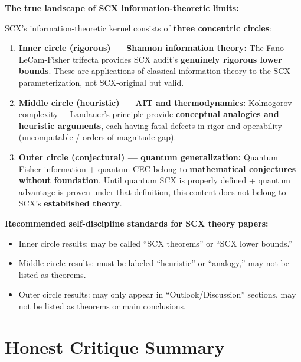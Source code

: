 \documentclass[12pt,a4paper]{article}
\theoremstyle{plain}
\theoremstyle{definition}
\begin{document}
\begin{limitbox}
\textbf{The true landscape of SCX information-theoretic limits:}

SCX's information-theoretic kernel consists of \textbf{three concentric circles}:
\begin{enumerate}[leftmargin=*]
    \item \textbf{Inner circle (rigorous) --- Shannon information theory:} The Fano-LeCam-Fisher trifecta provides SCX audit's \textbf{genuinely rigorous lower bounds}.
    These are applications of classical information theory to the SCX parameterization, not SCX-original but valid.

    \item \textbf{Middle circle (heuristic) --- AIT and thermodynamics:} Kolmogorov complexity + Landauer's principle provide \textbf{conceptual analogies and heuristic arguments},
    each having fatal defects in rigor and operability (uncomputable / orders-of-magnitude gap).

    \item \textbf{Outer circle (conjectural) --- quantum generalization:} Quantum Fisher information + quantum CEC belong to \textbf{mathematical conjectures without foundation}.
    Until quantum SCX is properly defined + quantum advantage is proven under that definition,
    this content does not belong to SCX's \textbf{established theory}.
\end{enumerate}

\textbf{Recommended self-discipline standards for SCX theory papers:}
\begin{itemize}
    \item Inner circle results: may be called ``SCX theorems'' or ``SCX lower bounds.''
    \item Middle circle results: must be labeled ``heuristic'' or ``analogy,'' may not be listed as theorems.
    \item Outer circle results: may only appear in ``Outlook/Discussion'' sections, may not be listed as theorems or main conclusions.
\end{itemize}
\end{limitbox}

\section{Honest Critique Summary}
\label{sec:conclusion}
\end{document}
